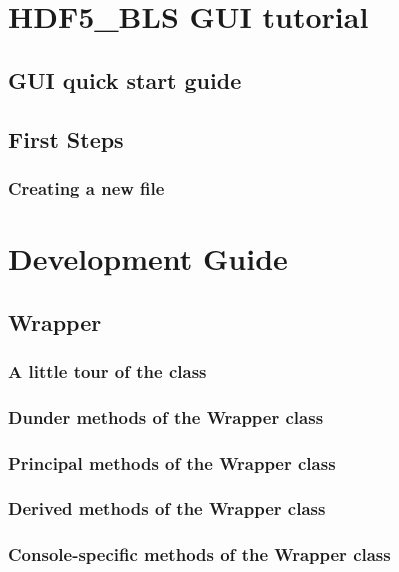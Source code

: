\documentclass{book}
\newcommand{\mypart}[1]{\setcounter{chapter}{0} \part{#1}}
\begin{document}
\mypart{HDF5\_BLS GUI tutorial}\label{part:GUI_tutorial}
    \chapter{GUI quick start guide}
        

    \chapter{First Steps}
        \section{Creating a new file}
            



\mypart{Development Guide} \label{part:dev_guide}
    \chapter{Wrapper}\label{chapter:wrapper}
        \section{A little tour of the class}
            
        
        \section{Dunder methods of the Wrapper class}
            

        \section{Principal methods of the Wrapper class}
            

        \section{Derived methods of the Wrapper class}
            

        \section{Console-specific methods of the Wrapper class}
            
\end{document}
